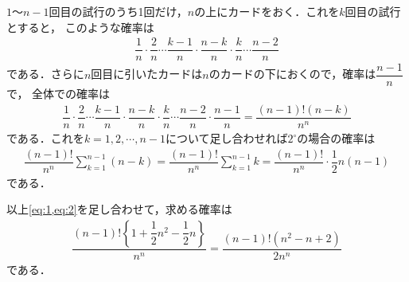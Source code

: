 \documentclass[../../main.tex]{subfiles}
\begin{document}
$1$〜$n-1$回目の試行のうち1回だけ，$n$の上にカードをおく．これを$k$回目の試行とすると，
このような確率は
\begin{align}
\dfrac{1}{n}\cdot\dfrac{2}{n}\cdots\dfrac{k-1}{n}\cdot\dfrac{n-k}{n}
\cdot\dfrac{k}{n}\cdots\dfrac{n-2}{n}
\end{align}
である．さらに$n$回目に引いたカードは$n$のカードの下におくので，確率は$\dfrac{n-1}{n}$で，
全体での確率は
\begin{align}
\dfrac{1}{n}\cdot\dfrac{2}{n}\cdots\dfrac{k-1}{n}\cdot\dfrac{n-k}{n}
\cdot\dfrac{k}{n}\cdots\dfrac{n-2}{n}\cdot\dfrac{n-1}{n}
=\dfrac{(n-1)!(n-k)}{n^n}
\end{align}
である．これを$k=1,2,\cdots,n-1$について足し合わせれば$2^{\circ}$の場合の確率は
\begin{align}
\dfrac{(n-1)!}{n^n}\sum_{k=1}^{n-1}(n-k)
=\dfrac{(n-1)!}{n^n}\sum_{k=1}^{n-1}k
=\dfrac{(n-1)!}{n^n}\cdot\dfrac{1}{2}n(n-1) \label{eq:2}
\end{align}
である．
\casesend

以上\cref{eq:1,eq:2}を足し合わせて，求める確率は
\begin{align}
\dfrac{(n-1)!\left\{1+\dfrac{1}{2}n^2-\dfrac{1}{2}n\right\}}{n^n}
=\dfrac{(n-1)!(n^2-n+2)}{2n^n}
\end{align}
である．
\end{document}
